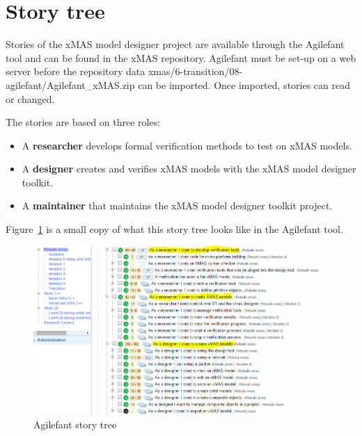 \section{Story tree}

Stories of the xMAS model designer project are available through the Agilefant
tool and can be found in the xMAS repository. Agilefant must be set-up on a web
server before the repository data xmas/6-transition/08-agilefant/Agilefant\_xMAS.zip
can be imported. Once imported, stories can read or changed.

The stories are based on three roles:
\begin{itemize}
\item A \textbf{researcher} develops formal verification methods to test on xMAS models.
\item A \textbf{designer} creates and verifies xMAS models with the xMAS model designer toolkit.
\item A \textbf{maintainer} that maintains the xMAS model designer toolkit project.
\end{itemize}

Figure~\ref{fig:story-tree} is a small copy of what this story tree looks like in the Agilefant tool.


\begin{figure}[here]
\begin{center}	
	\includegraphics[width=.70\linewidth]{pictures/story-tree}
	\caption{Agilefant story tree}
	\label{fig:story-tree}
\end{center}
\end{figure}

